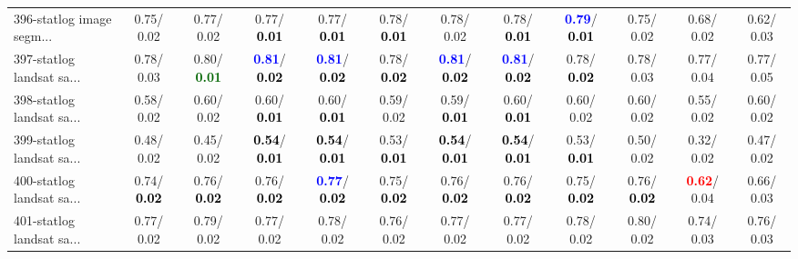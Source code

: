 \begin{table}[h]
\begin{center}
{\begin{tabular}{lc|c|c|c|c|c|c|c|c|c|c}
396-statlog image segm... &   0.75/  0.02 &   0.77/  0.02 &   0.77/\textcolor{black}{\textbf{  0.01}} &   0.77/\textcolor{black}{\textbf{  0.01}} &   0.78/\textcolor{black}{\textbf{  0.01}} &   0.78/  0.02 &   0.78/\textcolor{black}{\textbf{  0.01}} & \textcolor{blue}{\textbf{  0.79}}/\textcolor{black}{\textbf{  0.01}} &   0.75/  0.02 &   0.68/  0.02 &   0.62/  0.03 \\
397-statlog landsat sa... &   0.78/  0.03 &   0.80/\textcolor{darkgreen}{\textbf{  0.01}} & \textcolor{blue}{\textbf{  0.81}}/\textcolor{black}{\textbf{  0.02}} & \textcolor{blue}{\textbf{  0.81}}/\textcolor{black}{\textbf{  0.02}} &   0.78/\textcolor{black}{\textbf{  0.02}} & \textcolor{blue}{\textbf{  0.81}}/\textcolor{black}{\textbf{  0.02}} & \textcolor{blue}{\textbf{  0.81}}/\textcolor{black}{\textbf{  0.02}} &   0.78/\textcolor{black}{\textbf{  0.02}} &   0.78/  0.03 &   0.77/  0.04 &   0.77/  0.05 \\
398-statlog landsat sa... &   0.58/  0.02 &   0.60/  0.02 &   0.60/\textcolor{black}{\textbf{  0.01}} &   0.60/\textcolor{black}{\textbf{  0.01}} &   0.59/  0.02 &   0.59/\textcolor{black}{\textbf{  0.01}} &   0.60/\textcolor{black}{\textbf{  0.01}} &   0.60/  0.02 &   0.60/  0.02 &   0.55/  0.02 &   0.60/  0.02 \\ \hline
399-statlog landsat sa... &   0.48/  0.02 &   0.45/  0.02 & \textcolor{black}{\textbf{  0.54}}/\textcolor{black}{\textbf{  0.01}} & \textcolor{black}{\textbf{  0.54}}/\textcolor{black}{\textbf{  0.01}} &   0.53/\textcolor{black}{\textbf{  0.01}} & \textcolor{black}{\textbf{  0.54}}/\textcolor{black}{\textbf{  0.01}} & \textcolor{black}{\textbf{  0.54}}/\textcolor{black}{\textbf{  0.01}} &   0.53/\textcolor{black}{\textbf{  0.01}} &   0.50/  0.02 &   0.32/  0.02 &   0.47/  0.02 \\
400-statlog landsat sa... &   0.74/\textcolor{black}{\textbf{  0.02}} &   0.76/\textcolor{black}{\textbf{  0.02}} &   0.76/\textcolor{black}{\textbf{  0.02}} & \textcolor{blue}{\textbf{  0.77}}/\textcolor{black}{\textbf{  0.02}} &   0.75/\textcolor{black}{\textbf{  0.02}} &   0.76/\textcolor{black}{\textbf{  0.02}} &   0.76/\textcolor{black}{\textbf{  0.02}} &   0.75/\textcolor{black}{\textbf{  0.02}} &   0.76/\textcolor{black}{\textbf{  0.02}} & \textcolor{red}{\textbf{  0.62}}/  0.04 &   0.66/  0.03 \\
401-statlog landsat sa... &   0.77/  0.02 &   0.79/  0.02 &   0.77/  0.02 &   0.78/  0.02 &   0.76/  0.02 &   0.77/  0.02 &   0.77/  0.02 &   0.78/  0.02 &   0.80/  0.02 &   0.74/  0.03 &   0.76/  0.03 \\

\end{tabular}}
\end{center}
\end{table}
